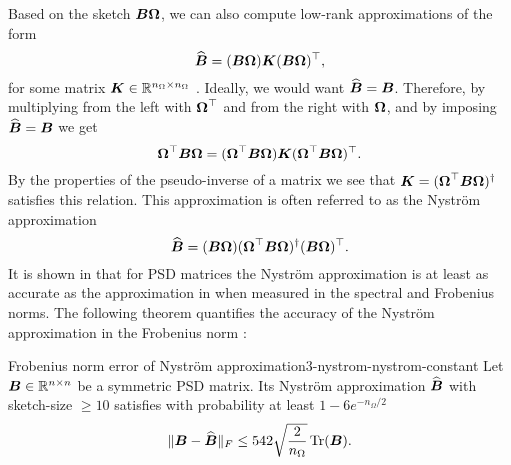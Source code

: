 Based on the sketch $\boldsymbol{B}\boldsymbol{\Omega}$, we can also compute low-rank approximations
of the form
\begin{equation}
    \widehat{\boldsymbol{B}} = (\boldsymbol{B} \boldsymbol{\Omega}) \boldsymbol{K} (\boldsymbol{B} \boldsymbol{\Omega})^{\top},
    \label{equ:3-nystrom-nystrom-general}
\end{equation}
for some matrix $\boldsymbol{K} \in \mathbb{R}^{n_{\Omega} \times n_{\Omega}}$ \cite[section~3.1]{lin2017randomized}.
Ideally, we would want $\widehat{\boldsymbol{B}} = \boldsymbol{B}$. Therefore, by multiplying 
from the left with $\boldsymbol{\Omega}^{\top}$ and from the right with $\boldsymbol{\Omega}$,
and by imposing $\widehat{\boldsymbol{B}} = \boldsymbol{B}$ we get
\begin{equation}
    \boldsymbol{\Omega}^{\top} \boldsymbol{B} \boldsymbol{\Omega} = (\boldsymbol{\Omega}^{\top} \boldsymbol{B} \boldsymbol{\Omega}) \boldsymbol{K} (\boldsymbol{\Omega}^{\top} \boldsymbol{B} \boldsymbol{\Omega})^{\top}.
    \label{equ:3-nystrom-nystrom-unknown}
\end{equation}
By the properties of the pseudo-inverse of a matrix we see that
$\boldsymbol{K} = (\boldsymbol{\Omega}^{\top} \boldsymbol{B} \boldsymbol{\Omega})^{\dagger}$ satisfies this
relation.
This approximation is often referred to as the Nystr\"om approximation \cite{gittens2013nystrom}
\begin{equation}
    \widehat{\boldsymbol{B}} = (\boldsymbol{B} \boldsymbol{\Omega}) (\boldsymbol{\Omega}^{\top} \boldsymbol{B} \boldsymbol{\Omega})^{\dagger} (\boldsymbol{B} \boldsymbol{\Omega})^{\top}.
    \label{equ:3-nystrom-nystrom}
\end{equation}
It is shown in \cite[lemma~5.2]{tropp2023randomized} that for \gls{PSD} matrices
the Nystr\"om approximation is at least as accurate as the approximation in
 when measured in the spectral
and Frobenius norms. The following theorem quantifies the accuracy of the
Nystr\"om approximation in the Frobenius norm \cite[lemma~3.2]{persson2022hutch}:

\begin{theorem}{Frobenius norm error of Nystr\"om approximation}{3-nystrom-nystrom-constant}
    Let $\boldsymbol{B} \in \mathbb{R}^{n \times n}$ be a symmetric \gls{PSD} matrix. Its Nystr\"om approximation
    $\widehat{\boldsymbol{B}}$  with \gls{sketch-size} $\geq 10$
    satisfies with probability at least $1-6e^{-n_{\Omega}/2}$
    \begin{equation}
        \lVert \boldsymbol{B} - \widehat{\boldsymbol{B}} \rVert _F \leq 542\sqrt{\frac{2}{n_{\Omega}}} \operatorname{Tr}(\boldsymbol{B}).
    \end{equation}
\end{theorem}

